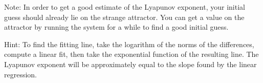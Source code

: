 Note: In order to get a good estimate of the Lyapunov exponent, your initial guess should already lie on the strange attractor.
You can get a value on the attractor by running the system for a while to find a good initial guess.

Hint: To find the fitting line, take the logarithm of the norms of the differences, compute a linear fit, then take the exponential function of the resulting line.
The Lyapunov exponent will be approximately equal to the slope found by the linear regression.
